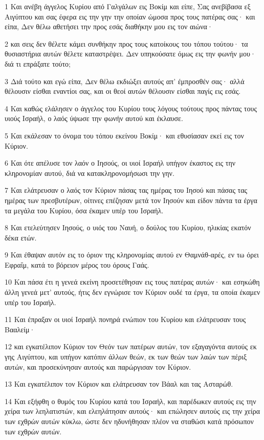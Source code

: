 \par 1 Και ανέβη άγγελος Κυρίου από Γαλγάλων εις Βοκίμ και είπε, Σας ανεβίβασα εξ Αιγύπτου και σας έφερα εις την γην την οποίαν ώμοσα προς τους πατέρας σας· και είπα, Δεν θέλω αθετήσει την προς εσάς διαθήκην μου εις τον αιώνα·
\par 2 και σεις δεν θέλετε κάμει συνθήκην προς τους κατοίκους του τόπου τούτου· τα θυσιαστήρια αυτών θέλετε καταστρέψει. Δεν υπηκούσατε όμως εις την φωνήν μου· διά τι επράξατε τούτο;
\par 3 Διά τούτο και εγώ είπα, Δεν θέλω εκδιώξει αυτούς απ' έμπροσθέν σας· αλλά θέλουσιν είσθαι εναντίοι σας, και οι θεοί αυτών θέλουσιν είσθαι παγίς εις εσάς.
\par 4 Και καθώς ελάλησεν ο άγγελος του Κυρίου τους λόγους τούτους προς πάντας τους υιούς Ισραήλ, ο λαός ύψωσε την φωνήν αυτού και έκλαυσε.
\par 5 Και εκάλεσαν το όνομα του τόπου εκείνου Βοκίμ· και εθυσίασαν εκεί εις τον Κύριον.
\par 6 Και ότε απέλυσε τον λαόν ο Ιησούς, οι υιοί Ισραήλ υπήγον έκαστος εις την κληρονομίαν αυτού, διά να κατακληρονομήσωσι την γην.
\par 7 Και ελάτρευσαν ο λαός τον Κύριον πάσας τας ημέρας του Ιησού και πάσας τας ημέρας των πρεσβυτέρων, οίτινες επέζησαν μετά τον Ιησούν και είδον πάντα τα έργα τα μεγάλα του Κυρίου, όσα έκαμεν υπέρ του Ισραήλ.
\par 8 Και ετελεύτησεν Ιησούς, ο υιός του Ναυή, ο δούλος του Κυρίου, ηλικίας εκατόν δέκα ετών.
\par 9 Και έθαψαν αυτόν εις το όριον της κληρονομίας αυτού εν Θαμνάθ-αρές, εν τω όρει Εφραΐμ, κατά το βόρειον μέρος του όρους Γαάς.
\par 10 Και πάσα έτι η γενεά εκείνη προσετέθησαν εις τους πατέρας αυτών· και εσηκώθη άλλη γενεά μετ' αυτούς, ήτις δεν εγνώρισε τον Κύριον ουδέ τα έργα, τα οποία έκαμεν υπέρ του Ισραήλ.
\par 11 Και έπραξαν οι υιοί Ισραήλ πονηρά ενώπιον του Κυρίου και ελάτρευσαν τους Βααλείμ·
\par 12 και εγκατέλιπον Κύριον τον Θεόν των πατέρων αυτών, τον εξαγαγόντα αυτούς εκ γης Αιγύπτου, και υπήγον κατόπιν άλλων θεών, εκ των θεών των λαών των πέριξ αυτών, και προσεκύνησαν αυτούς και παρώργισαν τον Κύριον.
\par 13 Και εγκατέλιπον τον Κύριον και ελάτρευσαν τον Βάαλ και τας Ασταρώθ.
\par 14 Και εξήφθη ο θυμός του Κυρίου κατά του Ισραήλ, και παρέδωκεν αυτούς εις την χείρα των λεηλατιστών, και ελεηλάτησαν αυτούς· και επώλησεν αυτούς εις την χείρα των εχθρών αυτών κύκλω, ώστε δεν ηδυνήθησαν πλέον να σταθώσι κατά πρόσωπον των εχθρών αυτών.
